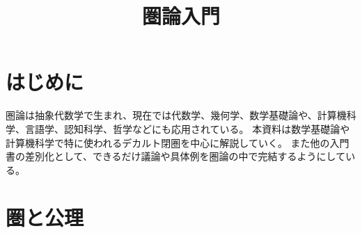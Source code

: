 \documentclass[dvipdfmx]{jsarticle}
\begin{document}
	\title{圏論入門}
	\maketitle
	\tableofcontents
	\section{はじめに}
	圏論は抽象代数学で生まれ、現在では代数学、幾何学、数学基礎論や、計算機科学、言語学、認知科学、哲学などにも応用されている。
	本資料は数学基礎論や計算機科学で特に使われるデカルト閉圏を中心に解説していく。
	また他の入門書の差別化として、できるだけ議論や具体例を圏論の中で完結するようにしている。
	\section{圏と公理}
\end{document}
